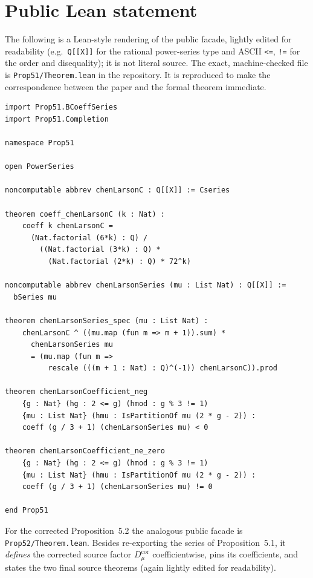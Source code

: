 \documentclass[11pt]{article}
\theoremstyle{definition}
\theoremstyle{remark}
\newcommand{\code}[1]{\texttt{#1}}
\begin{document}
\clearpage
\section{Public Lean statement}\label{app:lean-statement}

The following is a Lean-style rendering of the public facade, lightly edited for
readability (e.g.\ \code{Q[[X]]} for the rational power-series type and ASCII
\code{<=}, \code{!=} for the order and disequality); it is not literal source.
The exact, machine-checked file is \code{Prop51/Theorem.lean} in the repository.
It is reproduced to make the correspondence between the paper and the formal
theorem immediate.

\begin{lstlisting}
import Prop51.BCoeffSeries
import Prop51.Completion

namespace Prop51

open PowerSeries

noncomputable abbrev chenLarsonC : Q[[X]] := Cseries

theorem coeff_chenLarsonC (k : Nat) :
    coeff k chenLarsonC =
      (Nat.factorial (6*k) : Q) /
        ((Nat.factorial (3*k) : Q) *
          (Nat.factorial (2*k) : Q) * 72^k)

noncomputable abbrev chenLarsonSeries (mu : List Nat) : Q[[X]] :=
  bSeries mu

theorem chenLarsonSeries_spec (mu : List Nat) :
    chenLarsonC ^ ((mu.map (fun m => m + 1)).sum) *
      chenLarsonSeries mu
      = (mu.map (fun m =>
          rescale (((m + 1 : Nat) : Q)^(-1)) chenLarsonC)).prod

theorem chenLarsonCoefficient_neg
    {g : Nat} (hg : 2 <= g) (hmod : g % 3 != 1)
    {mu : List Nat} (hmu : IsPartitionOf mu (2 * g - 2)) :
    coeff (g / 3 + 1) (chenLarsonSeries mu) < 0

theorem chenLarsonCoefficient_ne_zero
    {g : Nat} (hg : 2 <= g) (hmod : g % 3 != 1)
    {mu : List Nat} (hmu : IsPartitionOf mu (2 * g - 2)) :
    coeff (g / 3 + 1) (chenLarsonSeries mu) != 0

end Prop51
\end{lstlisting}

\clearpage
For the corrected Proposition~5.2 the analogous public facade is
\code{Prop52/Theorem.lean}.  Besides re-exporting the series of
Proposition~5.1, it \emph{defines} the corrected source factor
$D_\mu^{\mathrm{cor}}$ coefficientwise, pins its coefficients, and states the two
final source theorems (again lightly edited for readability).
\end{document}

